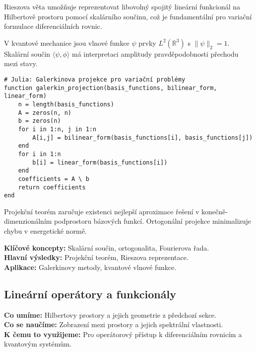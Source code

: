 \begin{keyinsight}
Rieszova věta umožňuje reprezentovat libovolný spojitý lineární funkcionál na Hilbertově prostoru pomocí skalárního součinu, což je fundamentální pro variační formulace diferenciálních rovnic.
\end{keyinsight}

\begin{example}
V kvantové mechanice jsou vlnové funkce $\psi$ prvky $L^2(\mathbb{R}^3)$ s $\|\psi\|_2 = 1$. Skalární součin $\langle \psi, \phi \rangle$ má interpretaci amplitudy pravděpodobnosti přechodu mezi stavy.
\end{example}

\begin{application}
\begin{verbatim}
# Julia: Galerkinova projekce pro variační problémy
function galerkin_projection(basis_functions, bilinear_form, linear_form)
    n = length(basis_functions)
    A = zeros(n, n)
    b = zeros(n)
    for i in 1:n, j in 1:n
        A[i,j] = bilinear_form(basis_functions[i], basis_functions[j])
    end
    for i in 1:n
        b[i] = linear_form(basis_functions[i])
    end
    coefficients = A \ b
    return coefficients
end
\end{verbatim}
Projekční teorém zaručuje existenci nejlepší aproximace řešení v konečně-dimenzionálním podprostoru bázových funkcí. Ortogonální projekce minimalizuje chybu v energetické normě.
\end{application}

\begin{summary}
\textbf{Klíčové koncepty:} Skalární součin, ortogonalita, Fourierova řada. \\
\textbf{Hlavní výsledky:} Projekční teorém, Rieszova reprezentace. \\
\textbf{Aplikace:} Galerkinovy metody, kvantové vlnové funkce.
\end{summary}

\spc

\subsection{Lineární operátory a funkcionály}

\begin{scaffold}
\textbf{Co umíme:} Hilbertovy prostory a jejich geometrie z předchozí sekce. \\
\textbf{Co se naučíme:} Zobrazení mezi prostory a jejich spektrální vlastnosti. \\
\textbf{K čemu to využijeme:} Pro operátorový přístup k diferenciálním rovnicím a kvantovým systémům.
\end{scaffold}

